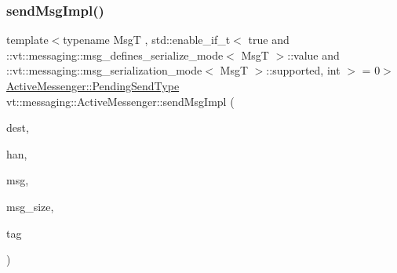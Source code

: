 \subsubsection{\texorpdfstring{send\+Msg\+Impl()}{sendMsgImpl()}\hspace{0.1cm}{\footnotesize\ttfamily [3/4]}}
{\footnotesize\ttfamily template$<$typename MsgT , std\+::enable\+\_\+if\+\_\+t$<$ true and \+::vt\+::messaging\+::msg\+\_\+defines\+\_\+serialize\+\_\+mode$<$ Msg\+T $>$\+::value and \+::vt\+::messaging\+::msg\+\_\+serialization\+\_\+mode$<$ Msg\+T $>$\+::supported, int $>$  = 0$>$ \\
\hyperlink{structvt_1_1messaging_1_1_active_messenger_a3626a6ca76d8ad4ec7c3b47a2c70d3a8}{Active\+Messenger\+::\+Pending\+Send\+Type} vt\+::messaging\+::\+Active\+Messenger\+::send\+Msg\+Impl (\begin{DoxyParamCaption}\item[{\hyperlink{namespacevt_a866da9d0efc19c0a1ce79e9e492f47e2}{Node\+Type}}]{dest,  }\item[{\hyperlink{namespacevt_af64846b57dfcaf104da3ef6967917573}{Handler\+Type}}]{han,  }\item[{\hyperlink{structvt_1_1messaging_1_1_msg_shared_ptr}{Msg\+Shared\+Ptr}$<$ MsgT $>$ \&}]{msg,  }\item[{\hyperlink{namespacevt_aab8d55968084610ce3b17057981e9300}{Byte\+Type}}]{msg\+\_\+size,  }\item[{\hyperlink{namespacevt_a84ab281dae04a52a4b243d6bf62d0e52}{Tag\+Type}}]{tag }\end{DoxyParamCaption})\hspace{0.3cm}{\ttfamily [inline]}}

\mbox{\label{structvt_1_1messaging_1_1_active_messenger_ae4d52bd4014fe9cfee3a60bf477fe998}} 
